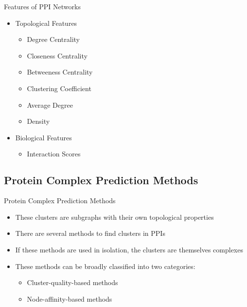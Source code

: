 \documentclass[aspectratio=169]{beamer}
\begin{document}
\begin{frame}{Features of PPI Networks}

\begin{itemize}
    \item Topological Features
    \begin{itemize}
        \item Degree Centrality
        \item Closeness Centrality
        \item Betweeness Centrality
        \item Clustering Coefficient
        \item Average Degree
        \item Density
    \end{itemize}
    \item Biological Features
    \begin{itemize}
        \item Interaction Scores
    \end{itemize}
\end{itemize}
    
\end{frame}

\subsection{Protein Complex Prediction Methods}
\begin{frame}{Protein Complex Prediction Methods}
    \begin{itemize}
        \item These clusters are subgraphs with their own topological properties
        \item There are several methods to find clusters in PPIs
        \item If these methods are used in isolation, the clusters are themselves complexes
        \item These methods can be broadly classified into two categories:
            \begin{itemize}
                \item Cluster-quality-based methods
                \item Node-affinity-based methods
            \end{itemize}
    \end{itemize}
\end{frame}
\end{document}
